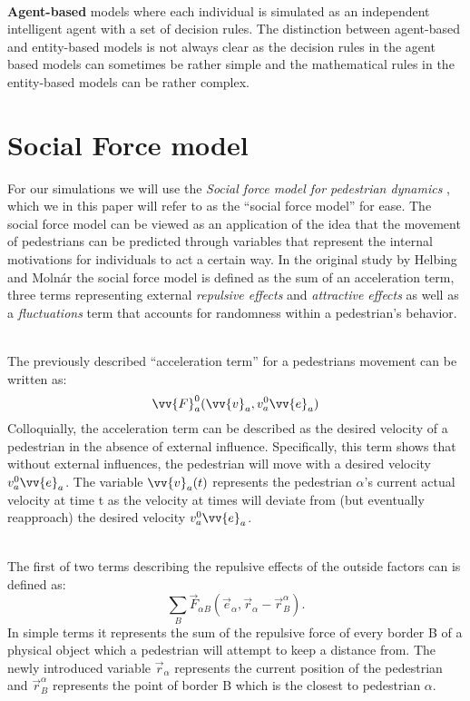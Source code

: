 \documentclass{kththesis}
\begin{document}
\noindent
\\
\textbf{Agent-based} models where each individual is simulated as an independent intelligent agent with a set of decision rules. The distinction between agent-based and entity-based models is not always clear as the decision rules in the agent based models can sometimes be rather simple and the mathematical rules in the entity-based models can be rather complex.

\section{Social Force model}
For our simulations we will use the \textit{Social force model for pedestrian dynamics} \parencite{helbing1995}, which we in this paper will refer to as the “social force model” for ease. The social force model can be viewed as an application of the idea that the movement of pedestrians can be predicted through variables that represent the internal motivations for individuals to act a certain way. In the original study by Helbing and Molnár the social force model is defined as the sum of an acceleration term, three terms representing external \textit{repulsive effects} and \textit{attractive effects} as well as a \textit{fluctuations} term that accounts for randomness within a pedestrian's behavior. 

\noindent
\\
The previously described “acceleration term” for a pedestrians movement can be written as: 
\[
\vv{F}_a^0(\vv{v}_a, {v}_a^0 \vv{e}_a) 
\] 
Colloquially, the acceleration term can be described as the desired velocity of a pedestrian in the absence of external influence. Specifically, this term shows that without external influences, the pedestrian will move with a desired velocity ${v}_a^0 \vv{e}_a$. The variable $\vv{v}_a(t)$ represents the pedestrian $\alpha$’s current actual velocity at time t as the velocity at times will deviate from (but eventually reapproach) the desired velocity ${v}_a^0 \vv{e}_a$. 

\noindent
\\
The first of two terms describing the repulsive effects of the outside factors can is defined as:
\[
\sum_B \vec{F}_{\alpha B} \left( \vec{e}_{\alpha}, \vec{r}_{\alpha} - \vec{r}_{B}^\alpha\right).
\]
In simple terms it represents the sum of the repulsive force of every border B of a physical object which a pedestrian will attempt to keep a distance from. The newly introduced variable $\vec{r}_\alpha$ represents the current position of the pedestrian and $\vec{r}_B^\alpha$ represents the point of border B which is the closest to pedestrian $\alpha$.
\end{document}

